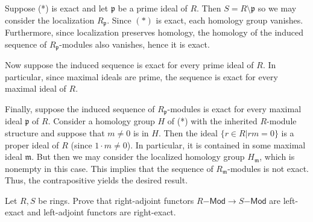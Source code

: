 \documentclass[../../master.tex]{subfiles}
\begin{document}
\begin{solution}
    Suppose (*) is exact and let $\mathfrak{p}$ be a prime ideal of $R$.
    Then $S = R \setminus \mathfrak{p}$ so we may consider the localization $R_{\mathfrak{p}}$.
    Since $(*)$ is exact, each homology group vanishes.
    Furthermore, since localization preserves homology, the homology of the induced sequence of $R_{\mathfrak{p}}$-modules also vanishes, hence it is exact.

    Now suppose the induced sequence is exact for every prime ideal of $R$.
    In particular, since maximal ideals are prime, the sequence is exact for every maximal ideal of  $R$.

    Finally, suppose the induced sequence of $R_{\mathfrak{p}}$-modules is exact for every maximal ideal $\mathfrak{p}$ of $R$.
    Consider a homology group $H$ of (*) with the inherited $R$-module structure and suppose that $m \neq 0$ is in $H$.
    Then the ideal $\{r \in R | rm = 0\}$ is a proper ideal of $R$ (since $1 \cdot m \neq 0$).
    In particular, it is contained in some maximal ideal $\mathfrak{m}$.
    But then we may consider the localized homology group $H_{\mathfrak{m}}$, which is nonempty in this case.
    This implies that the sequence of $R_{\mathfrak{m}}$-modules is not exact.
    Thus, the contrapositive yields the desired result.
\end{solution}

\begin{problem}
    Let $R, S$ be rings.
    Prove that right-adjoint functors $R\mathsf{-Mod} \to S\mathsf{-Mod}$ are left-exact and left-adjoint functors are right-exact.
\end{problem}
\end{document}
